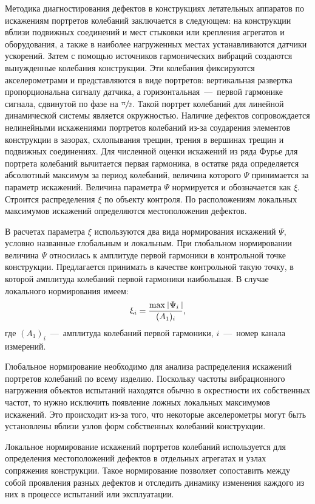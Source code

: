 Методика диагностирования дефектов в конструкциях летательных аппаратов по искажениям портретов колебаний заключается в следующем: на конструкции вблизи подвижных соединений и мест стыковки или крепления агрегатов и оборудования, а также в наиболее нагруженных местах устанавливаются датчики ускорений. Затем с помощью источников гармонических вибраций создаются вынужденные колебания конструкции. Эти колебания фиксируются акселерометрами и представляются в виде портретов: вертикальная развертка пропорциональна сигналу датчика, а горизонтальная~---~первой гармонике сигнала, сдвинутой по фазе на $ \sfrac{\uppi}{2} $. Такой портрет колебаний для линейной динамической системы является окружностью. Наличие дефектов сопровождается нелинейными искажениями портретов колебаний из-за соударения элементов конструкции в зазорах, схлопывания трещин, трения в вершинах трещин и подвижных соединениях. Для численной оценки искажений из ряда Фурье для портрета колебаний вычитается первая гармоника, в остатке ряда определяется абсолютный максимум за период колебаний, величина которого $ \Psi $ принимается за параметр искажений. Величина параметра $ \Psi $ нормируется и обозначается как $ \xi $. Строится распределения $ \xi $ по объекту контроля. По расположениям локальных максимумов искажений определяются местоположения дефектов.

В расчетах параметра $ \xi $ используются два вида нормирования искажений $ \Psi $, условно названные глобальным и локальным. При глобальном нормировании величина $ \Psi $ относилась к амплитуде первой гармоники в контрольной точке конструкции. Предлагается принимать в качестве контрольной такую точку, в которой амплитуда колебаний первой гармоники наибольшая. В случае локального нормирования имеем:
\begin{equation}
	\xi_i = \frac{\max \ \vline \Psi_i \ \vline}{(A_1)_i},
\end{equation}
где $ (A_1)_i $~---~амплитуда колебаний первой гармоники, $ i $~---~номер канала измерений.

Глобальное нормирование необходимо для анализа распределения искажений портретов колебаний по всему изделию. Поскольку частоты вибрационного нагружения объектов испытаний находятся обычно в окрестности их собственных частот, то нужно исключить появление ложных локальных максимумов искажений. Это происходит из-за того, что некоторые акселерометры могут быть установлены вблизи узлов форм собственных колебаний конструкции.

Локальное нормирование искажений портретов колебаний используется для определения местоположений дефектов в отдельных агрегатах и узлах сопряжения конструкции. Такое нормирование позволяет сопоставить между собой проявления разных дефектов и отследить динамику изменения каждого из них в процессе испытаний или эксплуатации.

